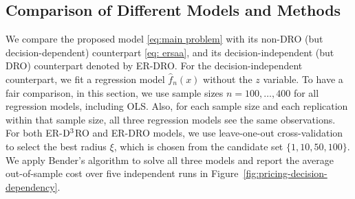 \documentclass[onefignum,onetabnum]{siamart251216}
\begin{document}
\subsection{Comparison of Different Models and Methods}
We compare the proposed model \eqref{eq:main problem} with its non-DRO (but decision-dependent) counterpart \eqref{eq: ersaa}, and its decision-independent (but DRO) counterpart denoted by ER-DRO. 
For the decision-independent counterpart, we fit a regression model $\hat{f}_n(x)$ without the $z$ variable. To have a fair comparison, in this section, we use sample sizes $n=100,\ldots,400$ for all regression models, including OLS. Also, for each sample size and each replication within that sample size, all three regression models see the same observations. For both ER-${\rm D^3}$RO and ER-DRO models, we use leave-one-out cross-validation to select the best radius $\xi$, which is chosen from the candidate set $\{1,10,50,100\}$. We apply Bender's algorithm to solve all three models and report the average out-of-sample cost over five independent runs in Figure\ \ref{fig:pricing-decision-dependency}.
\end{document}
